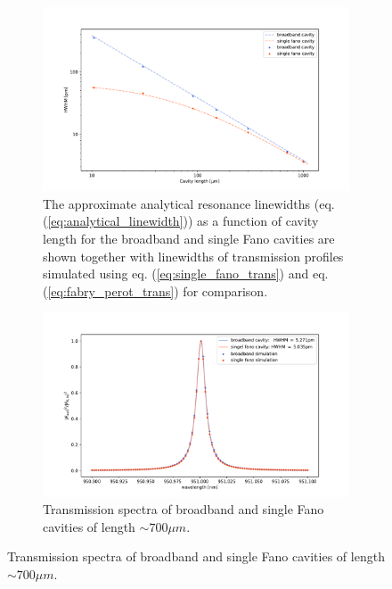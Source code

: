 \begin{figure}[h!]
    \centering
    \begin{subfigure}[c]{0.64\textwidth}
        \centering
        \includegraphics[width=\textwidth]{figures/HWHM_broadband_vs_single_sim.pdf}
        \caption{The approximate analytical resonance linewidths (eq. (\ref{eq:analytical_linewidth})) as a function of cavity length for the broadband and single Fano cavities are shown together with linewidths of transmission profiles simulated using eq. (\ref{eq:single_fano_trans}) and eq. (\ref{eq:fabry_perot_trans}) for comparison.}
        \label{fig:HWHM_broadband_vs_single_fano}
    \end{subfigure}
    \begin{subfigure}[c]{0.34\textwidth}
        \includegraphics[width=\textwidth]{figures/sim_single_vs_broadband_700um.pdf}
        \caption{Transmission spectra of broadband and single Fano cavities of length $\sim 700 \mu m$.}
        \label{fig:700um_broadband_and_single_fano_peak}

\end{subfigure}
\end{figure}
